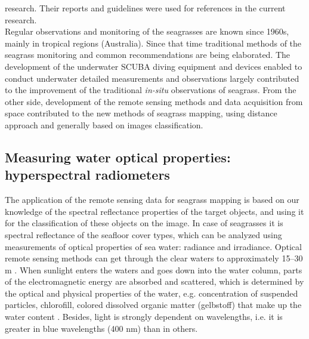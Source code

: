 \documentclass[11pt]{article}
\begin{document}
research. Their reports and guidelines were used for references in the current research.\\
Regular observations and monitoring of the seagrasses are known since 1960s, mainly in tropical
regions (Australia). Since that time traditional methods of the seagrass monitoring and common
recommendations are being elaborated. The development of the underwater SCUBA diving
equipment and devices enabled to conduct underwater detailed measurements and observations
largely contributed to the improvement of the traditional \textit{in-situ} observations of seagrass. From the
other side, development of the remote sensing methods and data acquisition from space contributed to
the new methods of seagrass mapping, using distance approach and generally based on images
classification.

\subsection[Measuring water optical properties]{Measuring water optical properties: \\hyperspectral radiometers}
The application of the remote sensing data for seagrass mapping is based on our knowledge of the
spectral reflectance properties of the target objects, and using it for the classification of these objects
on the image. In case of seagrasses it is spectral reflectance of the seafloor cover types, which can be
analyzed using measurements of optical properties of sea water: radiance and irradiance.
Optical remote sensing methods can get through the clear waters to approximately 15–30 m \cite{Mumby04}\label{Mumby04}.
When sunlight enters the waters and goes down into the water column, parts of the
electromagnetic energy are absorbed and scattered, which is determined by the optical and physical
properties of the water, e.g. concentration of suspended particles, chlorofill, colored dissolved
organic matter (gelbstoff) that make up the water content \cite{Ackleson2003}\label{Ackleson, 2003}. Besides, light is strongly
dependent on wavelengths, i.e. it is greater in blue wavelengths (400 nm) than in others.
\end{document}
